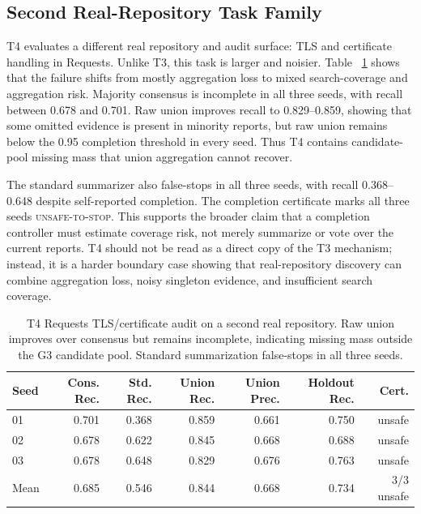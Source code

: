 \documentclass[letterpaper]{article}
\begin{document}
\subsection{Second Real-Repository Task Family}

T4 evaluates a different real repository and audit surface: TLS and certificate
handling in Requests. Unlike T3, this task is larger and noisier. Table
~\ref{tab:t4-realrepo} shows that the failure shifts from mostly aggregation
loss to mixed search-coverage and aggregation risk. Majority consensus is
incomplete in all three seeds, with recall between 0.678 and 0.701. Raw union
improves recall to 0.829--0.859, showing that some omitted evidence is present
in minority reports, but raw union remains below the 0.95 completion threshold
in every seed. Thus T4 contains candidate-pool missing mass that union
aggregation cannot recover.

The standard summarizer also false-stops in all three seeds, with recall
0.368--0.648 despite self-reported completion. The completion certificate marks
all three seeds \textsc{unsafe-to-stop}. This supports the broader claim that a
completion controller must estimate coverage risk, not merely summarize or vote
over the current reports. T4 should not be read as a direct copy of the T3
mechanism; instead, it is a harder boundary case showing that real-repository
discovery can combine aggregation loss, noisy singleton evidence, and
insufficient search coverage.

\begin{table}[t]
\centering
\small
\begin{tabular}{lrrrrrr}
\toprule
Seed & Cons. Rec. & Std. Rec. & Union Rec. & Union Prec. & Holdout Rec. & Cert. \\
\midrule
01 & 0.701 & 0.368 & 0.859 & 0.661 & 0.750 & unsafe \\
02 & 0.678 & 0.622 & 0.845 & 0.668 & 0.688 & unsafe \\
03 & 0.678 & 0.648 & 0.829 & 0.676 & 0.763 & unsafe \\
\midrule
Mean & 0.685 & 0.546 & 0.844 & 0.668 & 0.734 & 3/3 unsafe \\
\bottomrule
\end{tabular}
\caption{T4 Requests TLS/certificate audit on a second real repository. Raw
union improves over consensus but remains incomplete, indicating missing mass
outside the G3 candidate pool. Standard summarization false-stops in all three
seeds.}
\label{tab:t4-realrepo}
\end{table}
\end{document}
